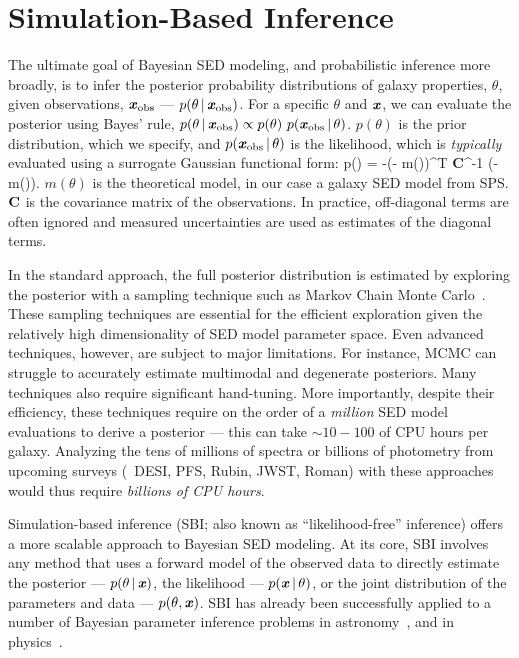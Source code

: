 \section{Simulation-Based Inference} \label{sec:sbi}
The ultimate goal of Bayesian SED modeling, and probabilistic inference more
broadly, is to infer the posterior probability distributions of galaxy
properties, $\theta$, given observations, $\textbf{\textit{x}}_{\rm obs}$  --- $p(\theta\,|\,\textbf{\textit{x}}_{\rm obs})$.
For a specific $\theta$ and $\textbf{\textit{x}}$, we can evaluate the posterior using
Bayes' rule, $p(\theta\,|\,\textbf{\textit{x}}_{\rm obs}) \propto p(\theta)~p(\textbf{\textit{x}}_{\rm obs}\,|\,\theta)$. 
$p(\theta)$ is the prior distribution, which we specify, and
$p(\textbf{\textit{x}}_{\rm obs}\,|\,\theta)$ is the likelihood, which is {\em typically}
evaluated using a surrogate Gaussian functional form: 
\beq
    \ln p(\xobs\given\theta) = -(\xobs - m(\theta))^T {\bf C}^{-1}
    (\xobs - m(\theta)).
\eeq
$m(\theta)$ is the theoretical model, in our case a galaxy SED model from SPS.
${\bf C}$ is the covariance matrix of the observations. 
In practice, off-diagonal terms are often ignored and measured uncertainties
are used as estimates of the diagonal terms. 

In the standard approach, the full posterior distribution is estimated by
exploring the posterior with a sampling technique such as Markov Chain Monte
Carlo~\citep[MCMC; \eg][]{carnall2018, leja2019a, tacchella2021}.
These sampling techniques are essential for the efficient exploration given 
the relatively high dimensionality of SED model parameter space.
Even advanced techniques, however, are subject to major limitations.  
For instance, MCMC can struggle to accurately estimate multimodal and
degenerate posteriors. 
Many techniques also require significant hand-tuning.
More importantly, despite their efficiency, these techniques require on the
order of a {\em million} SED model evaluations to derive a posterior --- this
can take ${\sim}10-100$ of CPU hours per galaxy.
Analyzing the tens of millions of spectra or billions of photometry from
upcoming surveys (\eg~DESI, PFS, Rubin, JWST, Roman) with these approaches
would thus require {\em billions of CPU hours}.

Simulation-based inference (SBI; also known as ``likelihood-free'' inference)
offers a more scalable approach to Bayesian SED modeling.
At its core, SBI involves any method that uses a forward model of the observed
data to directly estimate the posterior --- $p(\theta\,|\, \textbf{\textit{x}})$, the
likelihood --- $p(\textbf{\textit{x}}\,|\, \theta)$, or the joint distribution of the
parameters and data --- $p(\theta, \textbf{\textit{x}})$. 
SBI has already been successfully applied to a number of Bayesian parameter
inference problems in astronomy~\citep[\emph{e.g.}][]{cameron2012, weyant2013,
hahn2017b, kacprzak2018, alsing2018, wong2020, huppenkothen2021, zhang2021},
and in physics~\citep[\emph{e.g.}][]{brehmer2019, cranmer2020}.

